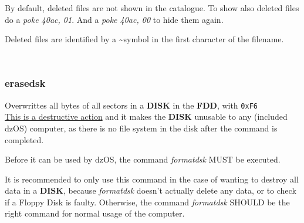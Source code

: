         \hfill\break

        By default, deleted files are not shown in the catalogue. To show also
        deleted files do a \textit{poke 40ac, 01}. And a \textit{poke 40ac, 00}
        to hide them again.

        Deleted files are identified by a \textasciitilde symbol in the first
        character of the filename.

        \texttt{
        }

        \hfill\break

        \subsubsection{{erasedsk}}
        Overwrittes all bytes of all sectors in a \textbf{DISK} in the
        \textbf{FDD}, with \texttt{0xF6} \\

        \underline{This is a destructive action} and it makes the \textbf{DISK}
        unusable to any (included dzOS) computer, as there is no file system in
        the disk after the command is completed.
        
        Before it can be used by dzOS, the command \textit{formatdsk} MUST be
        executed.

        It is recommended to only use this command in the case of wanting to
        destroy all data in a \textbf{DISK}, because \textit{formatdsk} doesn't
        actually delete any data, or to check if a Floppy Disk is faulty.
        Otherwise, the command \textit{formatdsk} SHOULD be the right command
        for normal usage of the computer.

